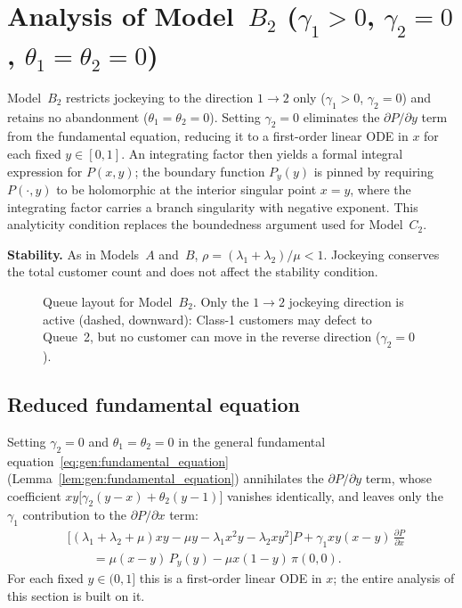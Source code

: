 \section{Analysis of Model~\texorpdfstring{$B_2$}{B2} (\texorpdfstring{$\gamma_1>0$}{gamma1>0}, \texorpdfstring{$\gamma_2=0$}{gamma2=0}, \texorpdfstring{$\theta_1=\theta_2=0$}{theta1=theta2=0})}\label{sec:model_b2}

Model~$B_2$ restricts jockeying to the direction $1\to2$ only ($\gamma_1>0$, $\gamma_2=0$) and retains no abandonment ($\theta_1=\theta_2=0$). Setting $\gamma_2=0$ eliminates the $\partial P/\partial y$ term from the fundamental equation, reducing it to a first-order linear ODE in $x$ for each fixed $y\in[0,1]$. An integrating factor then yields a formal integral expression for $P(x,y)$; the boundary function $P_y(y)$ is pinned by requiring $P(\cdot,y)$ to be holomorphic at the interior singular point $x=y$, where the integrating factor carries a branch singularity with negative exponent. This analyticity condition replaces the boundedness argument used for Model~$C_2$.

\textbf{Stability.} As in Models~$A$ and~$B$, $\rho = (\lambda_1+\lambda_2)/\mu < 1$. Jockeying conserves the total customer count and does not affect the stability condition.

\begin{figure}[H]
    \centering
    \resizebox{0.62\textwidth}{!}{%
    }
    \caption{Queue layout for Model~$B_2$. Only the $1\to2$ jockeying direction
    is active (dashed, downward): Class-1 customers may defect to Queue~2,
    but no customer can move in the reverse direction ($\gamma_2=0$).}
    \label{fig:model-b2-queue}
\end{figure}

\subsection{Reduced fundamental equation}\label{ssec:B2:reduction}

Setting $\gamma_2=0$ and $\theta_1=\theta_2=0$ in the general fundamental
equation~\eqref{eq:gen:fundamental_equation} (Lemma~\ref{lem:gen:fundamental_equation})
annihilates the $\partial P/\partial y$ term, whose coefficient
$xy\bigl[\gamma_2(y-x)+\theta_2(y-1)\bigr]$ vanishes identically, and leaves only the
$\gamma_1$ contribution to the $\partial P/\partial x$ term:
\begin{align}
    &\bigl[(\lambda_1+\lambda_2+\mu)xy - \mu y - \lambda_1 x^2 y - \lambda_2 xy^2\bigr]P
    + \gamma_1 xy(x-y)\,\frac{\partial P}{\partial x} \nonumber \\
    &\qquad = \mu(x-y)\,P_y(y) - \mu x(1-y)\,\pi(0,0).
    \label{eq:B2:fundamental}
\end{align}
For each fixed $y\in(0,1]$ this is a first-order linear ODE in $x$; the entire analysis
of this section is built on it.

